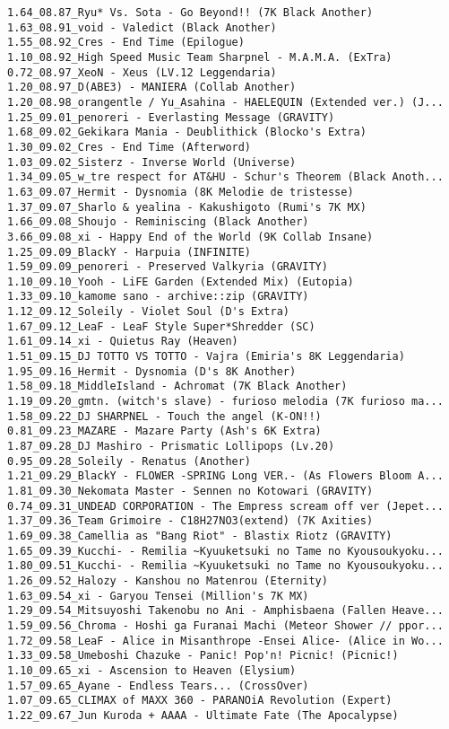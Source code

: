 \begin{lstlisting}
1.64_08.87_Ryu* Vs. Sota - Go Beyond!! (7K Black Another)
1.63_08.91_void - Valedict (Black Another)
1.55_08.92_Cres - End Time (Epilogue)
1.10_08.92_High Speed Music Team Sharpnel - M.A.M.A. (ExTra)
0.72_08.97_XeoN - Xeus (LV.12 Leggendaria)
1.20_08.97_D(ABE3) - MANIERA (Collab Another)
1.20_08.98_orangentle / Yu_Asahina - HAELEQUIN (Extended ver.) (J...
1.25_09.01_penoreri - Everlasting Message (GRAVITY)
1.68_09.02_Gekikara Mania - Deublithick (Blocko's Extra)
1.30_09.02_Cres - End Time (Afterword)
1.03_09.02_Sisterz - Inverse World (Universe)
1.34_09.05_w_tre respect for AT&HU - Schur's Theorem (Black Anoth...
1.63_09.07_Hermit - Dysnomia (8K Melodie de tristesse)
1.37_09.07_Sharlo & yealina - Kakushigoto (Rumi's 7K MX)
1.66_09.08_Shoujo - Reminiscing (Black Another)
3.66_09.08_xi - Happy End of the World (9K Collab Insane)
1.25_09.09_BlackY - Harpuia (INFINITE)
1.59_09.09_penoreri - Preserved Valkyria (GRAVITY)
1.10_09.10_Yooh - LiFE Garden (Extended Mix) (Eutopia)
1.33_09.10_kamome sano - archive::zip (GRAVITY)
1.12_09.12_Soleily - Violet Soul (D's Extra)
1.67_09.12_LeaF - LeaF Style Super*Shredder (SC)
1.61_09.14_xi - Quietus Ray (Heaven)
1.51_09.15_DJ TOTTO VS TOTTO - Vajra (Emiria's 8K Leggendaria)
1.95_09.16_Hermit - Dysnomia (D's 8K Another)
1.58_09.18_MiddleIsland - Achromat (7K Black Another)
1.19_09.20_gmtn. (witch's slave) - furioso melodia (7K furioso ma...
1.58_09.22_DJ SHARPNEL - Touch the angel (K-ON!!)
0.81_09.23_MAZARE - Mazare Party (Ash's 6K Extra)
1.87_09.28_DJ Mashiro - Prismatic Lollipops (Lv.20)
0.95_09.28_Soleily - Renatus (Another)
1.21_09.29_BlackY - FLOWER -SPRING Long VER.- (As Flowers Bloom A...
1.81_09.30_Nekomata Master - Sennen no Kotowari (GRAVITY)
0.74_09.31_UNDEAD CORPORATION - The Empress scream off ver (Jepet...
1.37_09.36_Team Grimoire - C18H27NO3(extend) (7K Axities)
1.69_09.38_Camellia as "Bang Riot" - Blastix Riotz (GRAVITY)
1.65_09.39_Kucchi- - Remilia ~Kyuuketsuki no Tame no Kyousoukyoku...
1.80_09.51_Kucchi- - Remilia ~Kyuuketsuki no Tame no Kyousoukyoku...
1.26_09.52_Halozy - Kanshou no Matenrou (Eternity)
1.63_09.54_xi - Garyou Tensei (Million's 7K MX)
1.29_09.54_Mitsuyoshi Takenobu no Ani - Amphisbaena (Fallen Heave...
1.59_09.56_Chroma - Hoshi ga Furanai Machi (Meteor Shower // ppor...
1.72_09.58_LeaF - Alice in Misanthrope -Ensei Alice- (Alice in Wo...
1.33_09.58_Umeboshi Chazuke - Panic! Pop'n! Picnic! (Picnic!)
1.10_09.65_xi - Ascension to Heaven (Elysium)
1.57_09.65_Ayane - Endless Tears... (CrossOver)
1.07_09.65_CLIMAX of MAXX 360 - PARANOiA Revolution (Expert)
1.22_09.67_Jun Kuroda + AAAA - Ultimate Fate (The Apocalypse)

\end{lstlisting}
